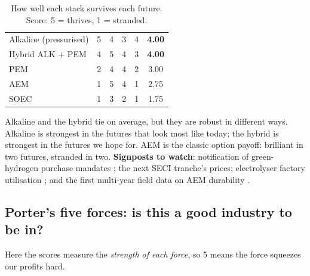 \begin{table}[H]\centering\tablefont
\caption{How well each stack survives each future. Score: 5 = thrives, 1 = stranded.}
\begin{tabularx}{\textwidth}{@{}L c c c c c@{}}
\toprule
{} &  &  &  &  & \\ \midrule
Alkaline (pressurised) & 5 & 4 & 3 & 4 & \textbf{4.00}\\
Hybrid ALK + PEM & 4 & 5 & 4 & 3 & \textbf{4.00}\\
PEM & 2 & 4 & 4 & 2 & 3.00\\
AEM & 1 & 5 & 4 & 1 & 2.75\\
SOEC & 1 & 3 & 2 & 1 & 1.75\\
\bottomrule
\end{tabularx}
\end{table}

Alkaline and the hybrid tie on average, but they are robust in different ways. Alkaline is strongest in the futures that look most like today; the hybrid is strongest in the futures we hope for. AEM is the classic option payoff: brilliant in two futures, stranded in two. \textbf{Signposts to watch}: notification of green-hydrogen purchase mandates \cite{xynteo2026}; the next SECI tranche's prices; electrolyser factory utilisation \cite{argus2026}; and the first multi-year field data on AEM durability \cite{enki2026}.

\subsection{Porter's five forces: is this a good industry to be in?}

Here the scores measure the \emph{strength of each force}, so 5 means the force squeezes our profits hard.

